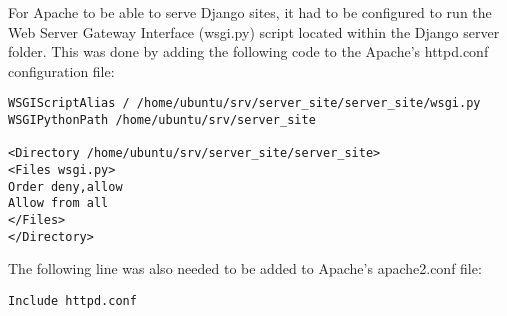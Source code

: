 For Apache to be able to serve Django sites, it had to be configured to run the Web Server
Gateway Interface (wsgi.py) script located within the Django server folder. This was done by
adding the following code to the Apache's httpd.conf configuration file:

\begin{verbatim}
WSGIScriptAlias / /home/ubuntu/srv/server_site/server_site/wsgi.py
WSGIPythonPath /home/ubuntu/srv/server_site

<Directory /home/ubuntu/srv/server_site/server_site>
<Files wsgi.py>
Order deny,allow
Allow from all
</Files>
</Directory>
\end{verbatim}

The following line was also needed to be added to Apache's apache2.conf file:

\begin{verbatim}
Include httpd.conf
\end{verbatim}